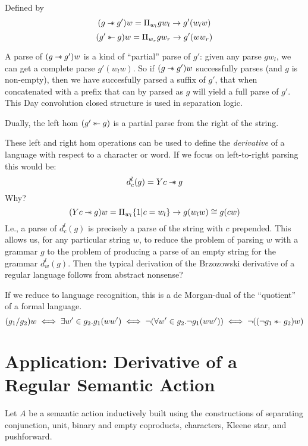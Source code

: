 \documentclass[12pt]{article}
\newcommand\rsepimp{\mathbin{-\mkern-6mu*}}
\newcommand\lsepimp{\mathbin{\rotatebox[origin=c]{180}{$-\mkern-6mu*$}}}
\begin{document}
Defined by
\[ (g \rsepimp g')w = \Pi_{w_l} g w_l \to g'(w_lw) \]
\[ (g' \lsepimp g)w = \Pi_{w_r} g w_r \to g'(ww_r) \]

A parse of $(g \rsepimp g')w$ is a kind of ``partial'' parse of $g'$:
given any parse $g w_l$, we can get a complete parse $g' (w_lw)$. So
if $(g \rsepimp g') w$ successfully parses (and $g$ is non-empty),
then we have succesfully parsed a suffix of $g'$, that when
concatenated with a prefix that can by parsed as $g$ will yield a full
parse of $g'$.
%
This Day convolution closed structure is used in separation logic.

Dually, the left hom $(g' \lsepimp g)$ is a partial parse from
the right of the string.

These left and right hom operations can be used to define the
\emph{derivative} of a language with respect to a character or
word. If we focus on left-to-right parsing this would be:
\[ d^l_c(g) = Yc \rsepimp g \]
Why?
\[ (Yc \rsepimp g)w = \Pi_{w_l} \{ 1 | c = w_l \} \to g(w_lw) \cong g(cw) \]
I.e., a parse of $d^l_c(g)$ is precisely a parse of the string with
$c$ prepended.
%
This allows us, for any particular string $w$, to reduce the problem
of parsing $w$ with a grammar $g$ to the problem of producing a parse
of an empty string for the grammar $d^l_w(g)$. Then the typical
derivation of the Brzozowski derivative of a regular language follows
from abstract nonsense?

If we reduce to language recognition, this is a de Morgan-dual of the
``quotient'' of a formal language.
\[ (g_1 / g_2) w \iff \exists w' \in g_2. g_1(ww') \iff \neg (\forall w' \in g_2. \neg g_1(ww')) \iff \neg ((\neg g_1 \lsepimp g_2) w) \]


\section{Application: Derivative of a Regular Semantic Action}

Let $A$ be a semantic action inductively built using the constructions
of separating conjunction, unit, binary and empty coproducts,
characters, Kleene star, and pushforward.
\end{document}
